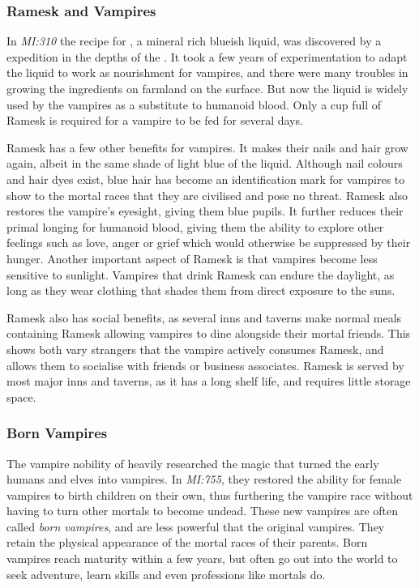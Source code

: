 \subsubsection{Ramesk and Vampires}

In \emph{MI:310} the recipe for , a mineral rich blueish
liquid, was discovered by a  expedition in the depths of
the . It took a few years of experimentation to
adapt the liquid to work as nourishment for vampires, and there were many
troubles in growing the ingredients on farmland on the surface. But now the
liquid is widely used by the vampires as a substitute to humanoid blood. Only
a cup full of Ramesk is required for a vampire to be fed for several days.

Ramesk has a few other benefits for vampires. It makes their nails and hair
grow again, albeit in the same shade of light blue of the liquid. Although
nail colours and hair dyes exist, blue hair has become an identification mark
for vampires to show to the mortal races that they are civilised and pose no
threat. Ramesk also restores the vampire's eyesight, giving them blue
pupils. It further reduces their primal longing for humanoid blood, giving
them the ability to explore other feelings such as love, anger or grief which
would otherwise be suppressed by their hunger. Another important aspect of
Ramesk is that vampires become less sensitive to sunlight. Vampires that drink
Ramesk can endure the daylight, as long as they wear clothing that shades them
from direct exposure to the suns.

Ramesk also has social benefits, as several inns and taverns make normal meals
containing Ramesk allowing vampires to dine alongside their mortal friends.
This shows both vary strangers that the vampire actively consumes Ramesk, and
allows them to socialise with friends or business associates. Ramesk is served
by most major inns and taverns, as it has a long shelf life, and requires
little storage space.

\subsubsection{Born Vampires}
\label{sec:Born Vampires}

The vampire nobility of  heavily researched the magic
that turned the early humans and elves into vampires. In \emph{MI:755}, they
restored the ability for female vampires to birth children on their own, thus
furthering the vampire race without having to turn other mortals to become
undead. These new vampires are often called \emph{born vampires}, and are less
powerful that the original vampires. They retain the physical appearance of
the mortal races of their parents. Born vampires reach maturity within a few
years, but often go out into the world to seek adventure, learn skills and
even professions like mortals do.

